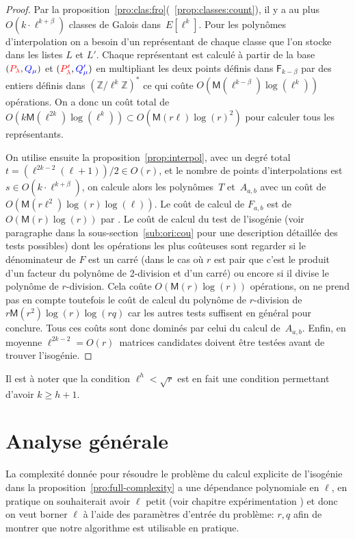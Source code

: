 \documentclass[10pt,a4paper]{book}
\theoremstyle{plain}
\theoremstyle{definition}
\theoremstyle{definition}
\theoremstyle{definition}
\theoremstyle{definition}
\theoremstyle{remark}
\theoremstyle{remark}
\theoremstyle{definition}
\begin{document}
\begin{proof}
  Par la proposition~\ref{pro:clas:fro}(~\ref{prop:classes:count}), il y a au 
  plus~$O(k \cdot \ell^{k+\beta})$ classes de Galois dans~$E[\ell^k]$. 
  Pour les polynômes d'interpolation on a besoin d'un représentant de chaque 
  classe que l'on stocke dans les listes $L$ et $L'$. Chaque représentant est
  calculé à partir de la base $(\color{red}P_{\lambda}\color{black},
  \color{blue}Q_{\mu}\color{black})$ et $(\color{red}P'_{\lambda}\color{black},
  \color{blue}Q'_{\mu}\color{black})$ en multipliant les deux points définis 
  dans $\mathsf{F}_{k-\beta}$ par des entiers définis dans 
  $\left( \mathbb{Z}/\ell^{k}\mathbb{Z}\right)^*$ ce qui coûte 
  $O(\mathsf{M}(\ell^{k-\beta})\log(\ell^k))$ opérations. On a donc un coût total de 
  $O(k\mathsf{M}(\ell^{2k})\log(\ell^k)) \subset O(\mathsf{M}(r\ell)\log(r)^2)$
  pour calculer tous les représentants.
  
  
  On utilise ensuite la proposition~\ref{prop:interpol}, avec un degré total
  ~$t = (\ell^{2k-2}(\ell+1))/2\in O(r)$, et le nombre de points d'interpolations
  est $s \in O(k \cdot \ell^{k+\beta})$, on calcule alors les polynômes~$T$
  et~$A_{a,b}$ avec un coût de~$O(\mathsf{M}(r \ell^2)\log(r)\log(\ell))$.  Le coût
  de calcul de $F_{a,b}$ est de $O(\mathsf{M}(r)\log(r))$ par 
  \cite[Théorème 7.5]{algeff17}. Le coût de calcul du test de l'isogénie (voir
  paragraphe dans la sous-section~\ref{sub:ori:cou} pour une description 
  détaillée des tests possibles) dont les opérations 
  les plus coûteuses sont regarder si le dénominateur de $F$ est un carré (dans
  le cas où $r$ est pair que c’est le produit d’un facteur du polynôme de 
  2-division et d’un carré) ou 
  encore si il divise le polynôme de $r$-division. Cela coûte $O(\mathsf{M}(r)
  \log(r))$ opérations, on ne prend pas en compte toutefois le coût de calcul
   du polynôme de $r$-division  de $r\mathsf{M}(r^2)\log(r)\log(r q)$ car 
  les autres tests suffisent en général pour conclure. Tous ces coûts sont donc
  dominés par celui du calcul de~$A_{a,b}$.  Enfin, en moyenne 
   ${\ell^{2k-2}=O(r)}$~matrices candidates doivent être testées
   avant de trouver l'isogénie.
\end{proof}
 
  Il est à noter que la condition $\ell^h<\sqrt{r}$ est en fait une condition 
  permettant d'avoir $k \geqslant h+1$.

\section{Analyse générale}
La complexité donnée pour résoudre le problème du calcul explicite de 
l'isogénie dans la proposition~\ref{pro:full-complexity} a une dépendance 
polynomiale en $\ell$, en pratique on souhaiterait avoir $\ell$ petit 
(voir chapitre expérimentation )
et donc on veut borner $\ell$ à l'aide des paramètres d'entrée du problème: $r,q$
afin de montrer que notre algorithme est utilisable en pratique. 
\end{document}
